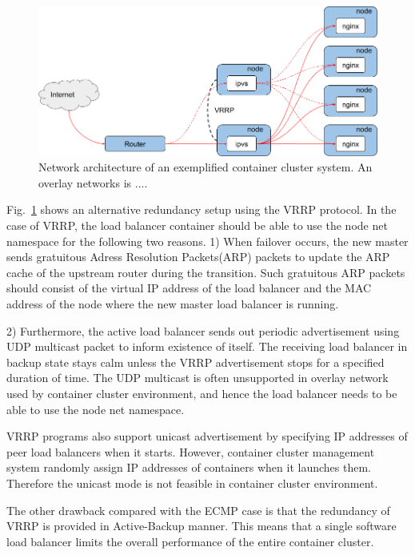 \begin{figure}[tb]
\begin{center}
\includegraphics[width=\columnwidth]{Figs/vrrp.png}
\end{center}
\caption{Network architecture of an exemplified container cluster system. An overlay networks is .... }
\label{fig:vrrp}
\end{figure}

Fig.~\ref{fig:vrrp} shows an alternative redundancy setup using the VRRP protocol.
In the case of VRRP, the load balancer container should be able to use the node net namespace for the following two reasons.
1) When failover occurs, the new master sends gratuitous Adress Resolution Packets(ARP) packets to update the ARP cache of the upstream router during the transition.
Such gratuitous ARP packets should consist of the virtual IP address of the load balancer and the MAC address of the node where the new master load balancer is running.

%
2) Furthermore, the active load balancer sends out periodic advertisement using UDP multicast packet to inform existence of itself.
The receiving load balancer in backup state stays calm unless the VRRP advertisement stops for a specified duration of time.
The UDP multicast is often unsupported in overlay network used by container cluster environment, and hence the load balancer needs to be able to use the node net namespace.

VRRP programs also support unicast advertisement by specifying IP addresses of peer load balancers when it starts.
However, container cluster management system randomly assign IP addresses of containers when it launches them.
Therefore the unicast mode is not feasible in container cluster environment.

The other drawback compared with the ECMP case is that the redundancy of VRRP is provided in Active-Backup manner.
This means that a single software load balancer limits the overall performance of the entire container cluster.

